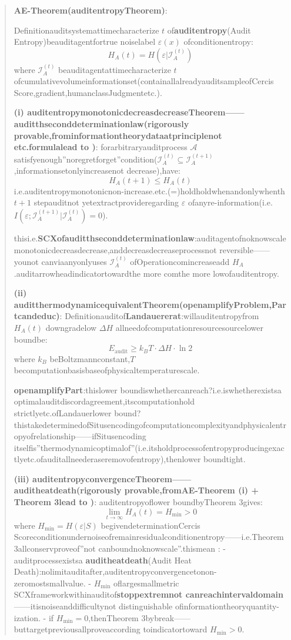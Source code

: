 \documentclass[
  12pt,
]{article}
\begin{document}
\begin{quote}
\textbf{AE-Theorem(auditentropyTheorem)}:

Definitionauditsystemattimecharacterize \(t\) of\textbf{auditentropy}(Audit
Entropy)beauditagentfortrue noiselabel  \(\varepsilon(x)\) ofconditionentropy:
\[H_A(t) = H(\varepsilon | \mathcal{I}_A^{(t)})\] where
\(\mathcal{I}_A^{(t)}\) beauditagentattimecharacterize \(t\)
ofcumulativevolumeinformationset(containallalreadyauditsampleofCercis Score,gradient,humanclassJudgmentetc.).

\textbf{(i)
auditentropymonotonicdecreasdecreaseTheorem------auditthseconddeterminationlaw(rigorously provable,frominformationtheorydataatprinciplenot etc.formulalead to )}:
forarbitraryauditprocess \(\mathcal{A}\)
satisfyenough''noregretforget''condition(\(\mathcal{I}_A^{(t)} \subseteq \mathcal{I}_A^{(t+1)}\),informationsetonlyincreasenot decrease),have:
\[H_A(t+1) \leq H_A(t)\] i.e.auditentropymonotonicnon-increase.etc.(=)holdholdwhenandonlywhenth \(t+1\)
stepauditnot yetextractprovideregarding \(\varepsilon\) ofanyre-information(i.e.
\(I(\varepsilon; \mathcal{I}_A^{(t+1)} | \mathcal{I}_A^{(t)}) = 0\)).

thisi.e.\textbf{SCXofauditthseconddeterminationlaw}:auditagentofnoknowscalemonotonicdecreasdecrease,anddecreasdecreaseprocessnot reversible------younot canviaanyonlyuses
\(\mathcal{I}_A^{(t)}\) ofOperationcomincreaseadd
\(H_A\).auditarrowheadindicatortowardthe more comthe more lowofauditentropy.

\textbf{(ii) auditthermodynamicequivalentTheorem(openamplifyProblem,Partcandeduc)}:
Definitionauditof\textbf{Landauererat}:willauditentropyfrom \(H_A(t)\) downgradelow \(\Delta H\)
allneedofcomputationresourcesourcelower boundbe:
\[E_{\text{audit}} \geq k_B T \cdot \Delta H \cdot \ln 2\] where \(k_B\)
beBoltzmannconstant,\(T\) becomputationbasisbaseofphysicaltemperaturescale.

\textbf{openamplifyPart}:thislower boundiswhethercanreach?i.e.iswhetherexistsa  optimalauditdiscordagreement,itscomputationhold strictlyetc.ofLandauerlower bound?thistakedeterminedofSitusencodingofcomputationcomplexityandphysicalentropyofrelationship------ifSitusencoding itselfis''thermodynamicoptimalof''(i.e.itsholdprocessofentropyproducingexactlyetc.ofauditallneederaseremovofentropy),thenlower boundtight.

\textbf{(iii) auditentropyconvergenceTheorem------auditheatdeath(rigorously provable,fromAE-Theorem (i) +
Theorem 3lead to )}: auditentropyoflower boundbyTheorem 3gives:
\[\lim_{t \to \infty} H_A(t) = H_{\min} > 0\] where
\(H_{\min} = H(\varepsilon | S)\) begivendeterminationCercis
Scoreconditionundernoiseofremainresidualconditionentropy------i.e.Theorem
3allconservproveof''not canboundnoknowscale''.thismean  : -
auditprocessexistsa  \textbf{auditheatdeath}(Audit Heat
Death):nolimitauditafter,auditentropyconvergencetonon-zeromostsmallvalue. - \(H_{\min}\)
oflargesmallmetric SCXframeworkwithinauditof\textbf{stoppextremnot canreachintervaldomain}------itisnoiseanddifficultynot distinguishable ofinformationtheoryquantity-ization.
- if \(H_{\min} = 0\),thenTheorem 3bybreak------buttargetpreviousallproveaccording toindicatortoward
\(H_{\min} > 0\).


\end{quote}
\end{document}
